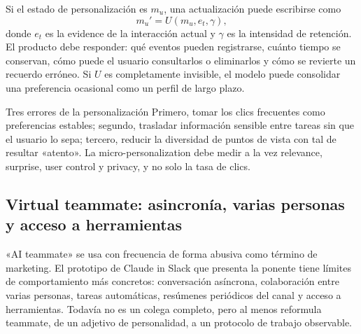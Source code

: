 


Si el estado de personalización es $m_u$, una actualización puede escribirse como
\[
m_u' = U(m_u,e_t,\gamma),
\]
donde $e_t$ es la evidence de la interacción actual y $\gamma$ es la intensidad de retención. El producto debe responder: qué eventos pueden registrarse, cuánto tiempo se conservan, cómo puede el usuario consultarlos o eliminarlos y cómo se revierte un recuerdo erróneo. Si $U$ es completamente invisible, el modelo puede consolidar una preferencia ocasional como un perfil de largo plazo.

\begin{warningbox}{Tres errores de la personalización}
Primero, tomar los clics frecuentes como preferencias estables; segundo, trasladar información sensible entre tareas sin que el usuario lo sepa; tercero, reducir la diversidad de puntos de vista con tal de resultar «atento». La micro-personalization debe medir a la vez relevance, surprise, user control y privacy, y no solo la tasa de clics.
\end{warningbox}


\subsection{Virtual teammate: asincronía, varias personas y acceso a herramientas}

«AI teammate» se usa con frecuencia de forma abusiva como término de marketing. El prototipo de Claude in Slack que presenta la ponente tiene límites de comportamiento más concretos: conversación asíncrona, colaboración entre varias personas, tareas automáticas, resúmenes periódicos del canal y acceso a herramientas. Todavía no es un colega completo, pero al menos reformula teammate, de un adjetivo de personalidad, a un protocolo de trabajo observable.

